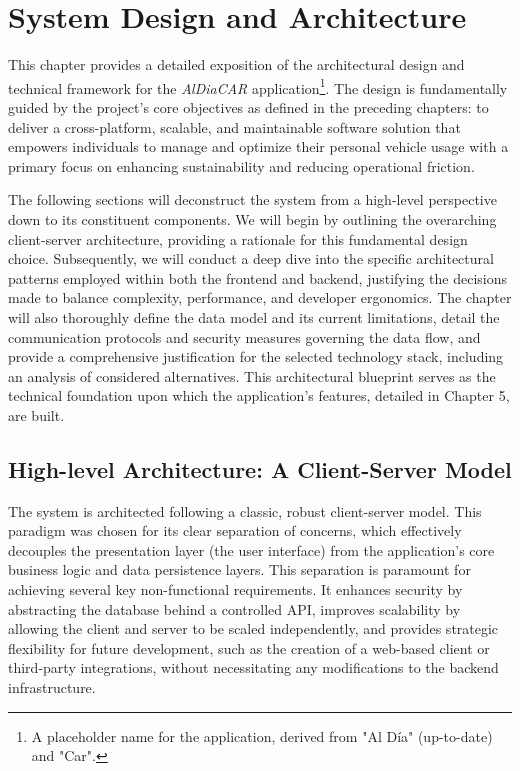 \chapter{System Design and Architecture}

This chapter provides a detailed exposition of the architectural design and technical framework for the \textit{AlDiaCAR} application\footnote{A placeholder name for the application, derived from "Al Día" (up-to-date) and "Car".}. The design is fundamentally guided by the project's core objectives as defined in the preceding chapters: to deliver a cross-platform, scalable, and maintainable software solution that empowers individuals to manage and optimize their personal vehicle usage with a primary focus on enhancing sustainability and reducing operational friction.

\textgap

The following sections will deconstruct the system from a high-level perspective down to its constituent components. We will begin by outlining the overarching client-server architecture, providing a rationale for this fundamental design choice. Subsequently, we will conduct a deep dive into the specific architectural patterns employed within both the frontend and backend, justifying the decisions made to balance complexity, performance, and developer ergonomics. The chapter will also thoroughly define the data model and its current limitations, detail the communication protocols and security measures governing the data flow, and provide a comprehensive justification for the selected technology stack, including an analysis of considered alternatives. This architectural blueprint serves as the technical foundation upon which the application's features, detailed in Chapter 5, are built.

\section{High-level Architecture: A Client-Server Model}

The system is architected following a classic, robust client-server model. This paradigm was chosen for its clear separation of concerns, which effectively decouples the presentation layer (the user interface) from the application's core business logic and data persistence layers. This separation is paramount for achieving several key non-functional requirements. It enhances security by abstracting the database behind a controlled API, improves scalability by allowing the client and server to be scaled independently, and provides strategic flexibility for future development, such as the creation of a web-based client or third-party integrations, without necessitating any modifications to the backend infrastructure.

